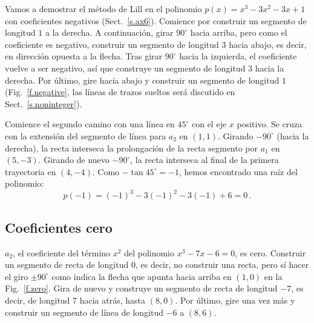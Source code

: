 Vamos a demostrar el método de Lill en el polinomio $p(x)=x^3-3x^2-3x+1$ con coeficientes negativos (Sect.~\ref{s.ax6}). Comience por construir un segmento de longitud $1$ a la derecha. A continuación, girar $90^\circ$ hacia arriba, pero como el coeficiente es negativo, construir un segmento de longitud $3$ hacia abajo, es decir, en dirección opuesta a la flecha. Tras girar $90^\circ$ hacia la izquierda, el coeficiente vuelve a ser negativo, así que construye un segmento de longitud $3$ hacia la derecha. Por último, gire hacia abajo y construir un segmento de longitud $ 1 $ (Fig.~\ref{f.negative}, las líneas de trazos sueltos será discutido en Sect.~\ref{s.noninteger}).

Comience el segundo camino con una línea en $ 45^\circ$ con el eje $x$ positivo. Se cruza con la extensión del segmento de línea para $a_2$ en $(1,1)$. Girando $-90^\circ$ (hacia la derecha), la recta interseca la prolongación de la recta segmento por $a_1$ en $(5,-3)$. Girando de nuevo $-90^\circ$, la recta interseca al final de la primera trayectoria en $(4,-4)$. Como $-\tan 45^\circ=-1$, hemos encontrado una raíz del polinomio:
\[p(-1)=(-1)^3-3(-1)^2-3(-1)+6=0\,.\]


\subsection{Coeficientes cero}\label{s.zero}
$a_2$, el coeficiente del término $x^2$ del polinomio $x^3-7x-6=0$, es cero. Construir un segmento de recta de longitud $0$, es decir, no construir una recta, pero sí hacer el giro $\pm 90^\circ$ como indica la flecha que apunta hacia arriba en $(1,0)$ en la Fig.~\ref{f.zero}. Gira de nuevo y construye un segmento de recta de longitud $-7$, es decir, de longitud $7$ hacia atrás, hasta $(8,0)$. Por último, gire una vez más y construir un segmento de línea de longitud $-6 $ a $(8,6)$.

